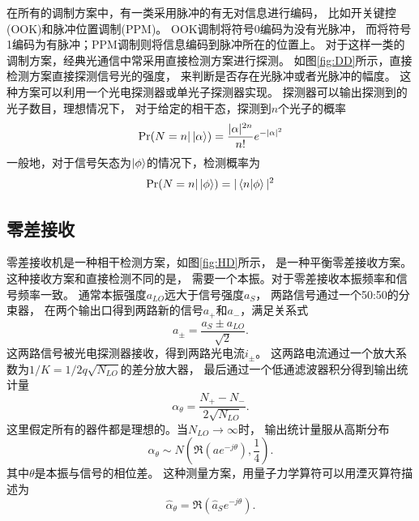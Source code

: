 在所有的调制方案中，有一类采用脉冲的有无对信息进行编码，
比如开关键控(OOK)和脉冲位置调制(PPM)。
OOK调制将符号0编码为没有光脉冲，
而将符号1编码为有脉冲；PPM调制则将信息编码到脉冲所在的位置上。
对于这样一类的调制方案，经典光通信中常采用直接检测方案进行探测。
如图\ref{fig:DD}所示，直接检测方案直接探测信号光的强度，
来判断是否存在光脉冲或者光脉冲的幅度\cite{gagliardi1976optical,gagliardi1998optical}。
这种方案可以利用一个光电探测器或单光子探测器实现。
探测器可以输出探测到的光子数目，理想情况下，
对于给定的相干态，探测到$n$个光子的概率
\begin{equation}
\Pr(N = n| \ket{\alpha}) = \frac{|\alpha|^{2n}}{n!} e^{-|\alpha|^2}
\label{eq:dd-prob}
\end{equation}
一般地，对于信号矢态为$\ket{\phi}$的情况下，检测概率为
\begin{equation}
\Pr(N = n| \ket{\phi}) = |\bra{n}\ket{\phi}|^2
\end{equation}



\subsection{零差接收}
零差接收机是一种相干检测方案，如图\ref{fig:HD}所示，
是一种平衡零差接收方案\cite{gagliardi1976optical,gagliardi1998optical}。
这种接收方案和直接检测不同的是，
需要一个本振。对于零差接收本振频率和信号频率一致。
通常本振强度$a_{LO}$远大于信号强度$a_S$，
两路信号通过一个50:50的分束器，
在两个输出口得到两路新的信号$a_+$和$a_-$，满足关系式
\begin{equation}
a_\pm = \frac{a_S \pm a_{LO}}{\sqrt{2}}.
\end{equation}
这两路信号被光电探测器接收，得到两路光电流$i_\pm$。
这两路电流通过一个放大系数为$1/K=1/2q\sqrt{N_{LO}}$的差分放大器，
最后通过一个低通滤波器积分得到输出统计量
\begin{equation}
\alpha_\theta = \frac{N_+ - N_-}{2\sqrt{N_{LO}}}.
\end{equation}
这里假定所有的器件都是理想的。当$N_{LO} \rightarrow \infty$时，
输出统计量服从高斯分布
\begin{equation}
\alpha_\theta \sim N(\Re(ae^{-j\theta}), \frac{1}{4}).
\label{eq:HD-alpha}
\end{equation}
其中$\theta$是本振与信号的相位差。
这种测量方案，用量子力学算符可以用湮灭算符描述为\cite{yuen1980optical,mandel1995optical}
\begin{equation}
\hat{\alpha}_\theta = \Re(\hat{a}_S e^{-j\theta}).
\end{equation}


